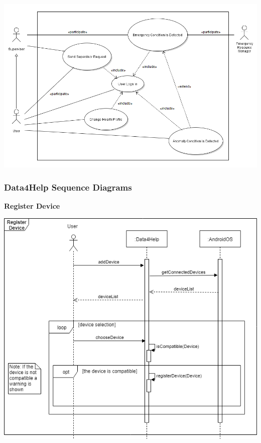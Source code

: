 \begin{center}
	\includegraphics[scale=1.1]{Images/UML/ASOS_usecase}
\end{center}


{\color{Blue}\subsubsection{Data4Help Sequence Diagrams}}

\textbf{Register Device}\par
\begin{center}
	\includegraphics[scale=0.6]{Images/UML/RegisterDeviceSeq.png}
\end{center}

